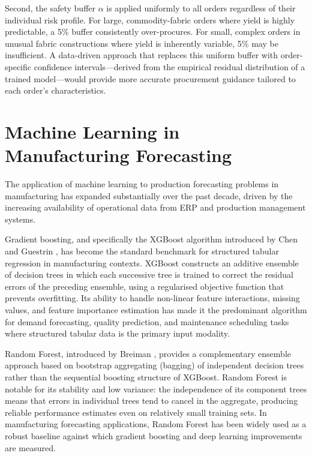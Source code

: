 Second, the safety buffer $\alpha$ is applied uniformly to all orders regardless of their individual risk profile. For large, commodity-fabric orders where yield is highly predictable, a 5\% buffer consistently over-procures. For small, complex orders in unusual fabric constructions where yield is inherently variable, 5\% may be insufficient. A data-driven approach that replaces this uniform buffer with order-specific confidence intervals---derived from the empirical residual distribution of a trained model---would provide more accurate procurement guidance tailored to each order's characteristics.

\secdiv
\section{Machine Learning in Manufacturing Forecasting}
The application of machine learning to production forecasting problems in manufacturing has expanded substantially over the past decade, driven by the increasing availability of operational data from ERP and production management systems.

Gradient boosting, and specifically the XGBoost algorithm introduced by Chen and Guestrin \cite{chen2016xgboost}, has become the standard benchmark for structured tabular regression in manufacturing contexts. XGBoost constructs an additive ensemble of decision trees in which each successive tree is trained to correct the residual errors of the preceding ensemble, using a regularised objective function that prevents overfitting. Its ability to handle non-linear feature interactions, missing values, and feature importance estimation has made it the predominant algorithm for demand forecasting, quality prediction, and maintenance scheduling tasks where structured tabular data is the primary input modality.

Random Forest, introduced by Breiman \cite{breiman2001random}, provides a complementary ensemble approach based on bootstrap aggregating (bagging) of independent decision trees rather than the sequential boosting structure of XGBoost. Random Forest is notable for its stability and low variance: the independence of its component trees means that errors in individual trees tend to cancel in the aggregate, producing reliable performance estimates even on relatively small training sets. In manufacturing forecasting applications, Random Forest has been widely used as a robust baseline against which gradient boosting and deep learning improvements are measured.

